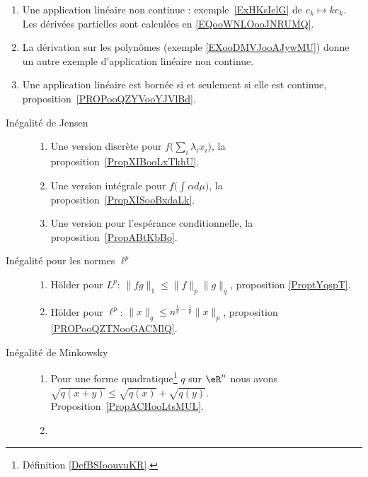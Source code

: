        \label{THEMEooYCBUooEnFdUg}
\begin{enumerate}
    \item
        Une application linéaire non continue : exemple~\ref{ExHKsIelG} de \( e_k\mapsto ke_k\). Les dérivées partielles sont calculées en \eqref{EQooWNLOooJNRUMQ}.
    \item
        La dérivation sur les polynômes (exemple \ref{EXooDMVJooAJywMU}) donne un autre exemple d'application linéaire non continue.
    \item
        Une application linéaire est bornée si et seulement si elle est continue, proposition~\ref{PROPooQZYVooYJVlBd}.
\end{enumerate}


\begin{description}
    \item[Inégalité de Jensen]
        \begin{enumerate}
            \item
                Une version discrète pour \( f\big( \sum_i\lambda_ix_i \big)\), la proposition~\ref{PropXIBooLxTkhU}.
            \item
                Une version intégrale pour \( f\big( \int \alpha d\mu \big)\), la proposition~\ref{PropXISooBxdaLk}.
            \item
                Une version pour l'espérance conditionnelle, la proposition~\ref{PropABtKbBo}.
        \end{enumerate}
    \item[Inégalité pour les normes $ \ell^p$]
        \begin{enumerate}
            \item
                Hölder pour \( L^p\): \( \| fg \|_1\leq \| f \|_p\| g \|_q\), proposition \ref{ProptYqspT}.
            \item
                Hölder pour \( \ell^p\): \( \| x \|_q\leq n^{\frac{1}{ q }-\frac{1}{ p }}\| x \|_p\), proposition \ref{PROPooQZTNooGACMlQ}.
        \end{enumerate}
    \item[Inégalité de Minkowsky]
        \begin{enumerate}
            \item
                Pour une forme quadratique\footnote{Définition \ref{DefBSIoouvuKR}.} \( q\) sur \( \eR^n\) nous avons $\sqrt{q(x+y)}\leq\sqrt{q(x)}+\sqrt{q(y)}$. Proposition~\ref{PropACHooLtsMUL}.
            \item

\end{enumerate}
\end{description}
